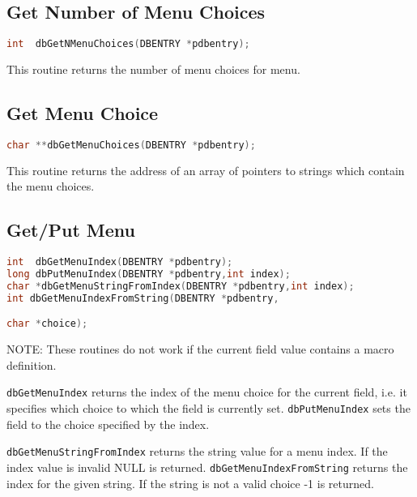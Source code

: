 \subsection{Get Number of Menu Choices}

\begin{lstlisting}[language=C]
int  dbGetNMenuChoices(DBENTRY *pdbentry);
\end{lstlisting}

This routine returns the number of menu choices for menu.

\subsection{Get Menu Choice}

\begin{lstlisting}[language=C]
char **dbGetMenuChoices(DBENTRY *pdbentry);
\end{lstlisting}

This routine returns the address of an array of pointers to strings which contain the menu choices.

\subsection{Get/Put Menu}

\begin{lstlisting}[language=C]
int  dbGetMenuIndex(DBENTRY *pdbentry);
long dbPutMenuIndex(DBENTRY *pdbentry,int index);
char *dbGetMenuStringFromIndex(DBENTRY *pdbentry,int index);
int dbGetMenuIndexFromString(DBENTRY *pdbentry,

char *choice);
\end{lstlisting}

NOTE: These routines do not work if the current field value contains a macro definition.

\verb|dbGetMenuIndex| returns the index of the menu choice for the current field, i.e. it specifies which choice to which the 
field is currently set.
\verb|dbPutMenuIndex| sets the field to the choice specified by the index.

\verb|dbGetMenuStringFromIndex| returns the string value for a menu index.
If the index value is invalid NULL is returned.
\verb|dbGetMenuIndexFromString| returns the index for the given string.
If the string is not a valid choice -1 is returned.

